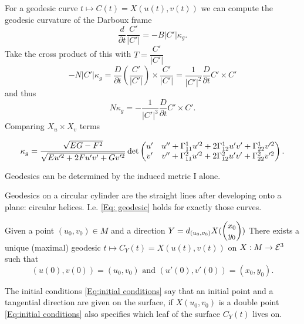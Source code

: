 \begin{remark}
	
	For a geodesic curve $ t \mapsto C(t) = X(u(t),v(t)) $ we can compute the geodesic curvature of the Darboux frame
		\[ \dfrac{d}{\partial t} \dfrac{C'}{|C'|} = - B |C'|\kappa_g. \]
	Take the cross product of this with $ T = \dfrac{C'}{|C'|} $
		\[ - N |C'|\kappa_g = \dfrac{D}{\partial t}\left(\dfrac{C'}{|C'|}\right) \times \dfrac{C'}{|C'|} = \dfrac{1}{|C'|^2} \dfrac{D}{\partial t}C' \times C' \] and thus
		\[ N\kappa_g = - \dfrac{1}{|C'|^3}\dfrac{D}{\partial t} C' \times C'. \]
		Comparing $ X_u \times X_v $ terms
		
		\[ \kappa_g = \frac {\sqrt{EG-F^2}}{\sqrt{Eu'^2+2Fu'v'+Gv'^2}} \det \begin{pmatrix} 
			u' & u'' + \Gamma_{11}^1 u'^2 + 2\Gamma_{12}^1u'v' + \Gamma_{22}^1v'^2\\
			v' & v'' + \Gamma_{11}^2 u'^2 + 2\Gamma_{12}^2u'v' + \Gamma_{22}^2v'^2 \end{pmatrix}.
		\]
		
	
\end{remark}

\begin{corollary}
	Geodesics can be determined by the induced metric $ \mathrm{I} $ alone.
\end{corollary}

\begin{example}
	
	Geodesics on a circular cylinder are the straight lines after developing onto a plane: circular helices.
	I.e. \ref*{Eq: geodesic} holds for exactly those curves.
	
\end{example}

\begin{corollary}
	
	Given a point $ (u_0,v_0) \in M $ and a direction $ Y = d_{(u_0,v_0)}X(\begin{pmatrix} x_0 \\ y_0 \end{pmatrix})  $
	There exists a unique (maximal) geodesic $ t \mapsto C_Y(t) = X(u(t),v(t)) $ on $ X: M \rightarrow \mathcal E^3 $ such that
		\[ (u(0),v(0)) = (u_0,v_0) \text{ and } (u'(0),v'(0)) = (x_0,y_0) \label{Eq:initial conditions}. \]
	
\end{corollary}

\begin{remark}
	
	The initial conditions \ref*{Eq:initial conditions} say that an initial point and a tangential direction are given on the surface, if $ X(u_0,v_0) $ is a double point \ref*{Eq:initial conditions} also specifies which leaf of the surface $ C_Y(t) $ lives on.
	
\end{remark}

